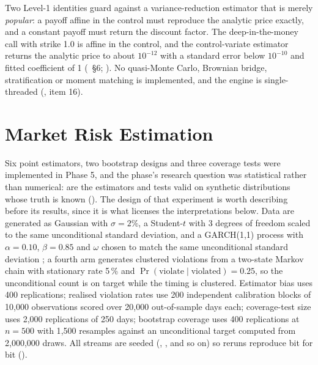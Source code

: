 \documentclass[11pt,a4paper]{article}
\begin{document}
Two Level-1 identities guard against a variance-reduction estimator that is merely
\emph{popular}: a payoff affine in the control must reproduce the analytic price exactly, and
a constant payoff must return the discount factor. The deep-in-the-money call with strike 1.0
is affine in the control, and the control-variate estimator returns the analytic price to
about $10^{-12}$ with a standard error below $10^{-10}$ and fitted coefficient of 1
(~\S6;
). No quasi-Monte Carlo, Brownian bridge,
stratification or moment matching is implemented, and the engine is single-threaded
(, item 16).

\section{Market Risk Estimation}
\label{sec:risk}

Six point estimators, two bootstrap designs and three coverage tests were implemented in
Phase 5, and the phase's research question was statistical rather than numerical: are the
estimators and tests valid on synthetic distributions whose truth is known
(). The design of that experiment is worth
describing before its results, since it is what licenses the interpretations below. Data are
generated as Gaussian with $\sigma = 2\%$, a Student-$t$ with 3 degrees of freedom scaled to
the same unconditional standard deviation, and a GARCH(1,1) process with $\alpha = 0.10$,
$\beta = 0.85$ and $\omega$ chosen to match the same unconditional standard deviation
\citep{bollerslev1986generalized}; a fourth arm generates clustered violations from a
two-state Markov chain with stationary rate 5\,\% and $\Pr(\text{violate} \mid \text{violated})
= 0.25$, so the unconditional count is on target while the timing is clustered. Estimator
bias uses 400 replications; realised violation rates use 200 independent calibration blocks of
10{,}000 observations scored over 20{,}000 out-of-sample days each; coverage-test size uses
2{,}000 replications of 250 days; bootstrap coverage uses 400 replications at $n = 500$ with
1{,}500 resamples against an unconditional target computed from 2{,}000{,}000 draws. All
streams are seeded (, , and so on) so reruns
reproduce bit for bit ().
\end{document}
